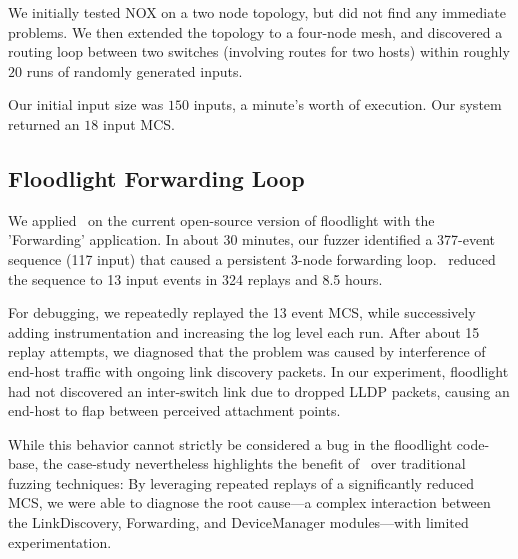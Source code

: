 We initially tested NOX on a two node topology, but did not find any immediate
problems. We then extended the topology to a four-node mesh, and discovered a
routing loop between two switches (involving routes for two hosts) within
roughly $20$ runs of randomly generated inputs.

Our initial input size was $150$ inputs, a minute's worth of execution.
Our system returned an $18$ input MCS.

\tbd{}

\subsection{Floodlight Forwarding Loop}

We applied \projectname~on the current open-source version of floodlight with the
'Forwarding' application. In about 30 minutes, our fuzzer identified a 377-event
sequence (117 input) that caused a persistent 3-node forwarding loop.
\projectname~reduced the sequence to 13 input events in 324 replays and 8.5 hours. 

For debugging, we repeatedly replayed the 13 event MCS, while successively adding
instrumentation and increasing the log level each run. After about 15 replay
attempts, we diagnosed that the problem was caused by interference of end-host
traffic with ongoing link discovery packets. In our experiment, floodlight had
not discovered an inter-switch link due to dropped LLDP packets, causing an
end-host to flap between perceived attachment points.

While this behavior cannot strictly be considered a bug in the floodlight
code-base, the case-study nevertheless highlights the benefit of
\projectname~over traditional fuzzing techniques: By leveraging repeated replays
of a significantly reduced MCS, we were able to diagnose the root cause---a
complex interaction between the LinkDiscovery, Forwarding, and DeviceManager
modules---with limited experimentation.
